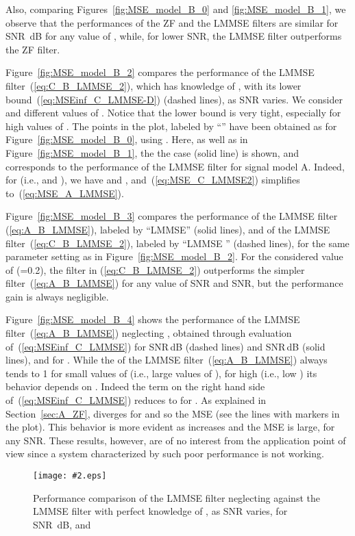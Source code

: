 \documentclass[final, a4paper]{IEEEtran}
\newcommand{\insertfig}[4]{
\begin{figure}[tbh]
\centerline{\texttt{[image: \#2.eps]}}
\vspace{-0.3cm}
\caption{#3}\label{#4}\end{figure}}
\begin{document}
Also, comparing Figures~\ref{fig:MSE_model_B_0} and \ref{fig:MSE_model_B_1}, we observe that
the performances of the ZF and the LMMSE filters are similar for SNR~dB for
any value of , while, for lower SNR,
the LMMSE filter outperforms the ZF filter.

Figure~\ref{fig:MSE_model_B_2} compares the performance of the LMMSE filter~(\ref{eq:C_B_LMMSE_2}), which
has knowledge of , with its lower bound~(\ref{eq:MSEinf_C_LMMSE-D}) (dashed lines), as SNR varies.
We consider  and different values of . Notice that the lower bound is
very tight, especially for high values of .
The points in the plot, labeled by ``'' have been obtained as for Figure~\ref{fig:MSE_model_B_0}, using .
Here, as well as in Figure~\ref{fig:MSE_model_B_1}, the the case  (solid line) is shown, and
corresponds to the performance of the LMMSE filter for signal model A. Indeed, for  (i.e.,  and ), we have  and , and~(\ref{eq:MSE_C_LMMSE2}) simplifies to~(\ref{eq:MSE_A_LMMSE}).

Figure~\ref{fig:MSE_model_B_3} compares the performance of the LMMSE filter (\ref{eq:A_B_LMMSE}),
labeled by ``LMMSE'' (solid lines), and of
the LMMSE filter~(\ref{eq:C_B_LMMSE_2}), labeled by ``LMMSE '' (dashed lines),
for the same parameter setting as in Figure~\ref{fig:MSE_model_B_2}.
For the considered value of  (=0.2), the filter in (\ref{eq:C_B_LMMSE_2})
outperforms the simpler filter~(\ref{eq:A_B_LMMSE}) for any value of SNR and SNR,
but the performance gain is always negligible.

Figure~\ref{fig:MSE_model_B_4} shows the performance of the
LMMSE filter~(\ref{eq:A_B_LMMSE}) neglecting ,
obtained through evaluation of~(\ref{eq:MSEinf_C_LMMSE}) for
SNR\,dB (dashed lines) and SNR\,dB (solid lines), and
for .
While the  of the LMMSE filter~(\ref{eq:A_B_LMMSE}) always tends to 1 for
small values of  (i.e., large values of ),
for high  (i.e., low ) its behavior depends on .
Indeed the term  on the right hand side
of~(\ref{eq:MSEinf_C_LMMSE}) reduces to  for .
As explained in Section~\ref{sec:A_ZF},  diverges for
 and so the MSE (see the lines with  markers in the plot).
This behavior is more evident as  increases and the MSE is large,
for any SNR. These results, however, are of no interest from the application point
of view since a system characterized by such poor performance is not working.

\insertfig{1.00}{MSE_model_B_5}{Performance comparison of the LMMSE filter neglecting  against
the LMMSE filter with perfect knowledge of , as SNR varies, for SNR~dB, and }
{fig:MSE_model_B_5}
\end{document}
